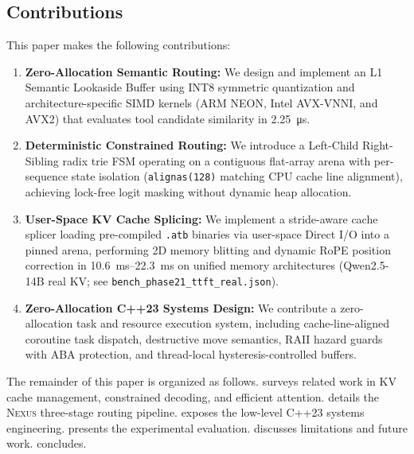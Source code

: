 \documentclass[conference,10pt]{IEEEtran}
\newcommand{\Nexus}{\textsc{Nexus}\xspace}
\begin{document}
\subsection{Contributions}
\label{subsec:contributions}

This paper makes the following contributions:

\begin{enumerate}
  \item[\textbf{C1.}] \textbf{Zero-Allocation Semantic Routing:} We design
    and implement an L1 Semantic Lookaside Buffer using INT8 symmetric
    quantization and architecture-specific SIMD kernels (ARM NEON, Intel AVX-VNNI,
    and AVX2) that evaluates tool candidate similarity in \SI{2.25}{\micro\second}.

  \item[\textbf{C2.}] \textbf{Deterministic Constrained Routing:} We
    introduce a Left-Child Right-Sibling radix trie FSM operating on a
    contiguous flat-array arena with per-sequence state isolation
    (\texttt{alignas(128)} matching CPU cache line alignment), achieving lock-free
    logit masking without dynamic heap allocation.

  \item[\textbf{C3.}] \textbf{User-Space KV Cache Splicing:} We implement a
    stride-aware cache splicer loading pre-compiled \texttt{.atb} binaries via user-space
    Direct I/O into a pinned arena, performing 2D memory blitting and dynamic RoPE position
    correction in \SIrange{10.6}{22.3}{\milli\second} on unified memory architectures
    (Qwen2.5-14B real KV; see \texttt{bench\_phase21\_ttft\_real.json}).

  \item[\textbf{C4.}] \textbf{Zero-Allocation C++23 Systems Design:} We contribute
    a zero-allocation task and resource execution system, including cache-line-aligned
    coroutine task dispatch, destructive move semantics, RAII hazard guards with
    ABA protection, and thread-local hysteresis-controlled buffers.
\end{enumerate}

The remainder of this paper is organized as follows. 
surveys related work in KV cache management, constrained decoding, and
efficient attention.  details the \Nexus three-stage
routing pipeline.  exposes the low-level C++23 systems
engineering.  presents the experimental evaluation.
 discusses limitations and future work.
 concludes.
\end{document}
